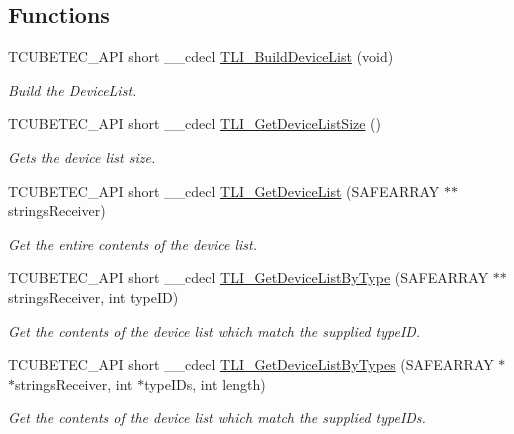 \subsection*{Functions}
\begin{DoxyCompactItemize}
\item 
T\+C\+U\+B\+E\+T\+E\+C\+\_\+\+A\+PI short \+\_\+\+\_\+cdecl \hyperlink{group___t_cube_t_e_c_ga7419666fc0786a29ee395ca54c3fb74f}{T\+L\+I\+\_\+\+Build\+Device\+List} (void)
\begin{DoxyCompactList}\small\item\em Build the Device\+List. \end{DoxyCompactList}\item 
T\+C\+U\+B\+E\+T\+E\+C\+\_\+\+A\+PI short \+\_\+\+\_\+cdecl \hyperlink{group___t_cube_t_e_c_ga12a79e33af516c29e22679a86f1aabcd}{T\+L\+I\+\_\+\+Get\+Device\+List\+Size} ()
\begin{DoxyCompactList}\small\item\em Gets the device list size. \end{DoxyCompactList}\item 
T\+C\+U\+B\+E\+T\+E\+C\+\_\+\+A\+PI short \+\_\+\+\_\+cdecl \hyperlink{group___t_cube_t_e_c_ga7c1cbd78063b6f937f46c3040fc53d8f}{T\+L\+I\+\_\+\+Get\+Device\+List} (S\+A\+F\+E\+A\+R\+R\+AY $\ast$$\ast$strings\+Receiver)
\begin{DoxyCompactList}\small\item\em Get the entire contents of the device list. \end{DoxyCompactList}\item 
T\+C\+U\+B\+E\+T\+E\+C\+\_\+\+A\+PI short \+\_\+\+\_\+cdecl \hyperlink{group___t_cube_t_e_c_ga535404bbc4ddfc2a4994d6c8a1987a0e}{T\+L\+I\+\_\+\+Get\+Device\+List\+By\+Type} (S\+A\+F\+E\+A\+R\+R\+AY $\ast$$\ast$strings\+Receiver, int type\+ID)
\begin{DoxyCompactList}\small\item\em Get the contents of the device list which match the supplied type\+ID. \end{DoxyCompactList}\item 
T\+C\+U\+B\+E\+T\+E\+C\+\_\+\+A\+PI short \+\_\+\+\_\+cdecl \hyperlink{group___t_cube_t_e_c_gaaa137df8b0a69de42ced500c6574ac9a}{T\+L\+I\+\_\+\+Get\+Device\+List\+By\+Types} (S\+A\+F\+E\+A\+R\+R\+AY $\ast$$\ast$strings\+Receiver, int $\ast$type\+I\+Ds, int length)
\begin{DoxyCompactList}\small\item\em Get the contents of the device list which match the supplied type\+I\+Ds. \end{DoxyCompactList}\item 
$$
\end{DoxyCompactItemize}
